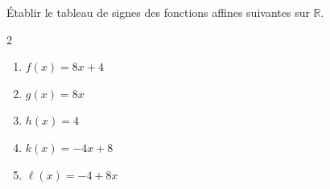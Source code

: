 \begin{exo}{}
	Établir le tableau de signes des fonctions affines suivantes sur $\mathbb{R}$.
	\vspace*{-2mm}\begin{multicols}{2}
		\begin{enumerate}
			\item $f(x) = 8x + 4$
			\item $g(x) = 8x$
			\item $h(x) = 4$
			\item $k(x) = -4x + 8$
			\item $\ell(x) = -4 + 8x$
		\end{enumerate}
	\end{multicols}
\end{exo}
